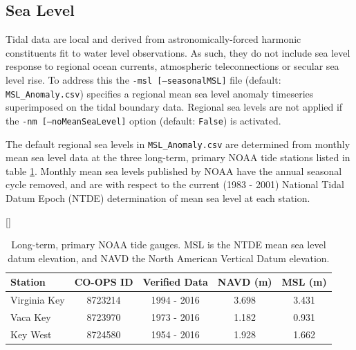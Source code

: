 \subsection{Sea Level}
\label{sec:Sea Level}
Tidal data are local and derived from astronomically-forced harmonic constituents fit to water level observations. As such, they do not include sea level response to regional ocean currents, atmospheric teleconnections or secular sea level rise.  To address this the \texttt{-msl [--seasonalMSL]} file (default: \texttt{MSL\_Anomaly.csv}) specifies a regional mean sea level anomaly timeseries superimposed on the tidal boundary data.  Regional sea levels are not applied if the \texttt{-nm [--noMeanSeaLevel]} option (default: \texttt{False}) is activated. 

The default regional sea levels in \texttt{MSL\_Anomaly.csv} are determined from monthly mean sea level data at the three long-term, primary NOAA tide stations  listed in table \ref{table:Sea Level Stations}.  Monthly mean sea levels published by NOAA have the annual seasonal cycle removed, and are with respect to the current (1983 - 2001) National Tidal Datum Epoch (NTDE) determination of mean sea level at each station.

\begin{table}[H]
  [\FBwidth]
  {
     \caption{ Long-term, primary NOAA tide gauges.  MSL is the 
               NTDE mean sea level datum elevation, and NAVD 
               the North American Vertical Datum elevation. }
     \label{table:Sea Level Stations}
  }
  {
    \centering
    \begin{tabular}{ l c c c c }
      \hline
      Station     & CO-OPS ID & Verified Data & NAVD (m) & MSL (m)\\
      \hline
      Virginia Key  & 8723214 & 1994 - 2016   & 3.698    & 3.431\\
      Vaca Key      & 8723970 & 1973 - 2016   & 1.182    & 0.931\\
      Key West      & 8724580 & 1954 - 2016   & 1.928    & 1.662\\
      \hline
    \end{tabular}
  }
\end{table}


